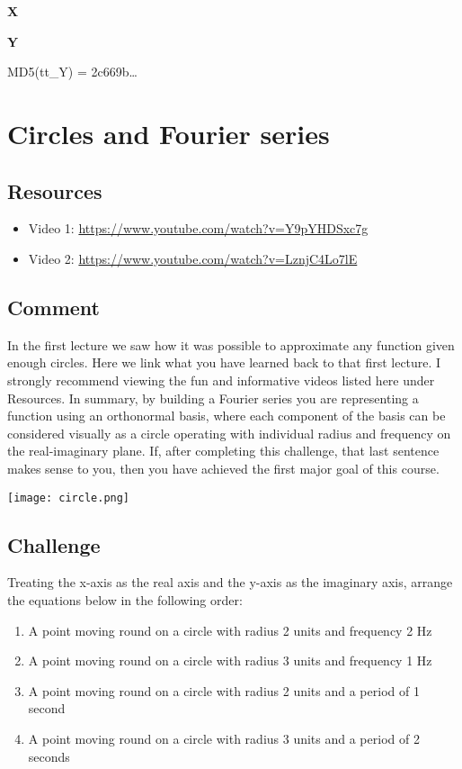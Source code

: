 \textbf{X}


\textbf{Y}

MD5(tt\_Y) = 2c669b\ldots




\newpage
\section{Circles and Fourier series}

\subsection*{Resources}
\begin{itemize}
    \item Video 1: \url{https://www.youtube.com/watch?v=Y9pYHDSxc7g}
    \item Video 2: \url{https://www.youtube.com/watch?v=LznjC4Lo7lE}
\end{itemize}

\subsection*{Comment}
In the first lecture we saw how it was possible to approximate any function given enough circles. Here we link what you have learned back to that first lecture. I strongly recommend viewing the fun and informative videos listed here under Resources. In summary, by building a Fourier series you are representing a function using an orthonormal basis, where each component of the basis can be considered visually as a circle operating with individual radius and frequency on the real-imaginary plane. If, after completing this challenge, that last sentence makes sense to you, then you have achieved the first major goal of this course.

\texttt{[image: circle.png]}

\subsection*{Challenge}
Treating the x-axis as the real axis and the y-axis as the imaginary axis, arrange the equations below in the following order:

\begin{enumerate}
    \item A point moving round on a circle with radius 2 units and frequency 2 Hz
    \item A point moving round on a circle with radius 3 units and frequency 1 Hz
    \item A point moving round on a circle with radius 2 units and a period of 1 second
    \item A point moving round on a circle with radius 3 units and a period of 2 seconds
\end{enumerate}

